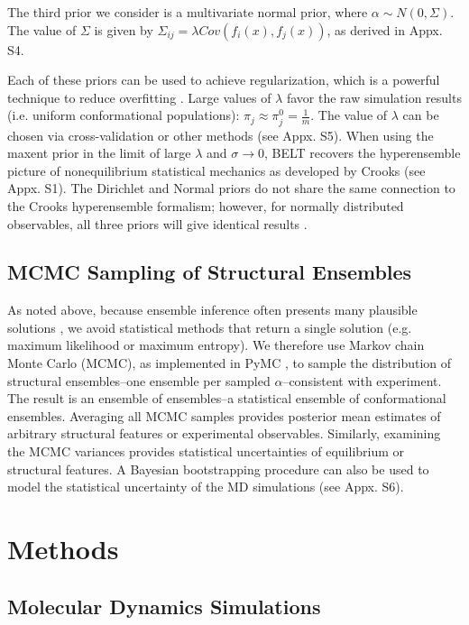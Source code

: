\documentclass[journal=jacsat,manuscript=article]{achemso}
\begin{document}
The third prior we consider is a multivariate normal prior, where  $\alpha \sim N(0, \Sigma)$.  The value of $\Sigma$ is given by $\Sigma_{ij} = \lambda Cov(f_i(x), f_j(x))$, as derived in Appx. S4.

Each of these priors can be used to achieve regularization, which is a powerful technique to reduce overfitting \cite{friedman2001elements}.  Large values of $\lambda$ favor the raw simulation results (i.e. uniform conformational populations): $\pi_j \approx \pi_j^0 = \frac{1}{m}$.  The value of $\lambda$ can be chosen via cross-validation or other methods (see Appx. S5).  When using the maxent prior in the limit of large $\lambda$ and $\sigma \rightarrow 0$, BELT recovers the hyperensemble picture of nonequilibrium statistical mechanics as developed \cite{crooks2007beyond} by Crooks (see Appx. S1).  The Dirichlet and Normal priors do not share the same connection to the Crooks hyperensemble formalism; however, for normally distributed observables, all three priors will give identical results \cite{relative_entropy_wiki}.  

\subsection*{MCMC Sampling of Structural Ensembles}

As noted above, because ensemble inference often presents many plausible solutions  \cite{fisher2010, rieping2005}, we avoid statistical methods that return a single solution (e.g. maximum likelihood or maximum entropy).  We therefore use Markov chain Monte Carlo (MCMC), as implemented in PyMC  \cite{patil2010pymc}, to sample the distribution of structural ensembles--one ensemble per sampled $\alpha$--consistent with experiment.  The result is an ensemble of ensembles--a statistical ensemble of conformational ensembles.  Averaging all MCMC samples provides posterior mean  estimates of arbitrary structural features or experimental observables.  Similarly, examining the MCMC variances provides statistical uncertainties of equilibrium or structural features.  A Bayesian bootstrapping procedure  \cite{rubin1981} can also be used to model the statistical uncertainty of the MD simulations (see Appx. S6).

\section*{Methods}

\subsection*{Molecular Dynamics Simulations}
\end{document}
